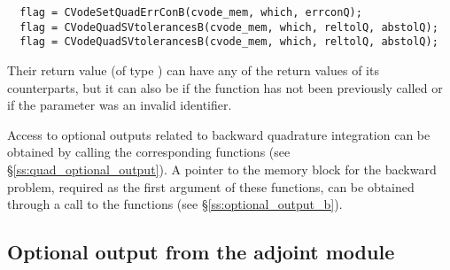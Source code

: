 \begin{verbatim}
  flag = CVodeSetQuadErrConB(cvode_mem, which, errconQ);
  flag = CVodeQuadSVtolerancesB(cvode_mem, which, reltolQ, abstolQ);
  flag = CVodeQuadSVtolerancesB(cvode_mem, which, reltolQ, abstolQ);
\end{verbatim}
Their return value  (of type ) can have any of the return values 
of its counterparts, but it can also be  if the function 
 has not been previously called or  if the
parameter  was an invalid identifier.

Access to optional outputs related to backward quadrature integration can be obtained
by calling the corresponding  functions 
(see \S\ref{ss:quad_optional_output}). 
A pointer to the {\cvodes} memory block for the backward problem, required as the first 
argument of these functions, can be obtained through a call to the functions 
 (see \S\ref{ss:optional_output_b}).



\subsection{Optional output from the adjoint module}
